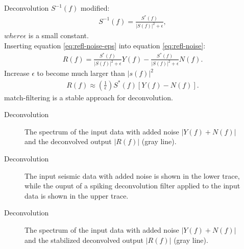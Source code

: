 \documentclass[xcolor=dvipsnames,notes]{beamer}
\begin{document}
%
\begin{frame}{Deconvolution}
$S^{-1}(f)$  modified:
%
\begin{eqnarray}
  S^{-1}(f) = \frac{S^*(f)}{|S(f)|^2+\epsilon},
      \label{eq:refl-noise-eps}
\end{eqnarray}
%
$where \epsilon$ is a small constant.\\
Inserting equation \eqref{eq:refl-noise-eps} into
equation  \eqref{eq:refl-noise}:
%
\begin{eqnarray}
  R(f) = \frac{S^*(f)}{|S(f)|^2+\epsilon}Y(f)- \frac{S^*(f)}{|S(f)|^2+\epsilon}N(f).
      \label{eq:refl-noise-2}
\end{eqnarray}
%
Increase $\epsilon$ to become much larger than $|s(f)|^2$ 
%
\begin{eqnarray}
  R(f) \approx \left(\frac{1}{\epsilon}\right)S^*(f)[Y(f)-N(f)].
      \label{eq:refl-noise-match}
\end{eqnarray}
%
match-filtering is a stable approach for deconvolution.
\end{frame}
%
\begin{frame}{Deconvolution}
%
\begin{figure}[h]
\caption{The spectrum of the input data with added noise $|Y(f)+N(f)|$ and the
         deconvolved output $|R(f)|$ (gray line).}
\label{fig:fdecon3-spectr}
\end{figure}
%
\end{frame}
%
\begin{frame}{Deconvolution}
\begin{figure}[h]
\caption{The input seismic data with added noise is shown in the lower trace, while the
         ouput of a spiking deconvolution filter applied to the input data
         is shown in the upper trace.}
\label{fig:fdecon3}
\end{figure}
\end{frame}
%
%
\begin{frame}{Deconvolution}
\begin{figure}[h]
\caption{The spectrum of the input data with added noise $|Y(f)+N(f)|$ and the
         stabilized deconvolved output $|R(f)|$ (gray line).}
\label{fig:fdecon4-spectr}
\end{figure}
\end{frame}
\end{document}
